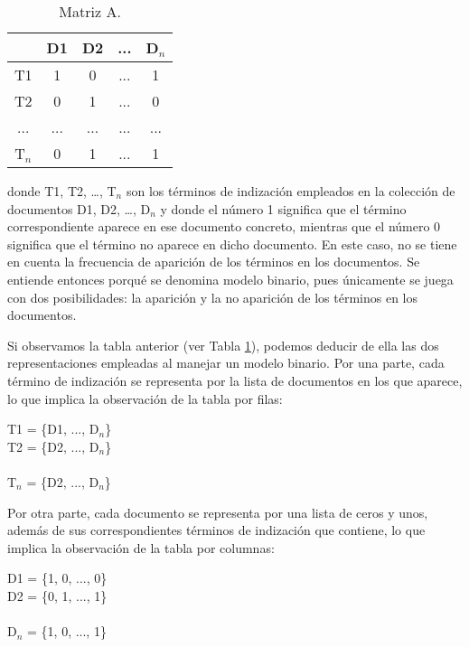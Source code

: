 \documentclass[titlepage]{article}
\begin{document}
	\begin{table}[h]
		\begin{center}
			\begin{tabular}{ |c|c|c|c|c| }
				\hline 
				& D1 & D2 & ... & D$_{n}$ \\ 
				\hline
				T1 & 1 & 0 & ... & 1 \\ 
				\hline
				T2 & 0 & 1 & ... & 0 \\ 
				\hline
				... & ... & ...	& ... & ... \\
				\hline
				T$_{n}$ & 0 & 1 & ... & 1 \\ 
				\hline
			\end{tabular}
			\caption{Matriz A.}
			\label{fig: Table 2}
		\end{center}
	\end{table}
	
	donde T1, T2, …, T$_{n}$ son los términos de indización empleados en la colección de documentos D1, D2, …, D$_{n}$ y donde el número 1 significa que el término correspondiente aparece en ese documento concreto, mientras que el número 0 significa que el término no aparece en dicho documento. En este caso, no se tiene en cuenta la frecuencia de aparición de los términos en los documentos. Se entiende entonces porqué se denomina modelo binario, pues únicamente se juega con dos posibilidades: la aparición y la no aparición de los términos en los documentos.
	
	Si observamos la tabla anterior (ver Tabla \ref{fig: Table 2}), podemos deducir de ella las dos representaciones empleadas al manejar un modelo binario. Por una parte, cada término de indización se representa por la lista de documentos en los que aparece, lo que implica la observación de la tabla por filas:
	
	\begin{center}
		T1 = \{D1, ..., D$_{n}$\} \\
		T2 = \{D2, ..., D$_{n}$\} \\
		 \\
		T$_{n}$ = \{D2, ..., D$_{n}$\} \\
	\end{center}
	
	\newpage
	
	Por otra parte, cada documento se representa por una lista de ceros y unos, además de sus correspondientes términos de indización que contiene, lo que implica la observación de la tabla por columnas:
	
	\begin{center}
		D1 = \{1, 0, ..., 0\} \\
		D2 = \{0, 1, ..., 1\} \\
		 \\
		D$_{n}$ = \{1, 0, ..., 1\} \\
	\end{center}
	
\end{document}
